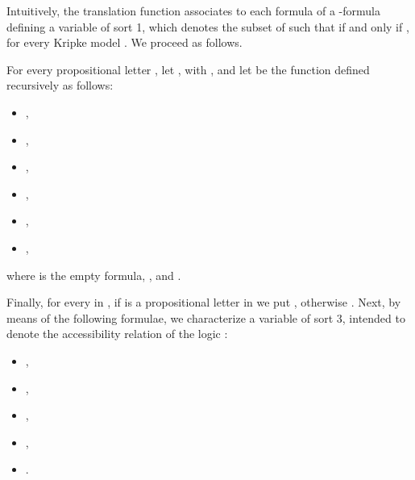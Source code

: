 \documentclass{fundam}
\begin{document}
Intuitively, the translation function  associates to each formula 
of  a -formula defining a variable  of sort 1, which denotes
the subset  of  such that  if and only if , for every Kripke model
. We proceed as follows.

For every propositional letter , let ,
with , and let  be the function defined recursively as follows:

\begin{itemize}
\item ,

\item ,

\item ,

\item ,

\item 

\hfill ,

\item 

\hfill ,
\end{itemize}
where  is the empty formula, , and .

Finally, for every  in , if  is a
propositional letter in  we put , otherwise .
Next, by means of the following formulae, we characterize a variable
 of sort 3, intended to denote the accessibility relation 
of the logic :
\begin{itemize}
\item ,

\item ,

\item ,

\item ,

\item .
\end{itemize}
\end{document}
